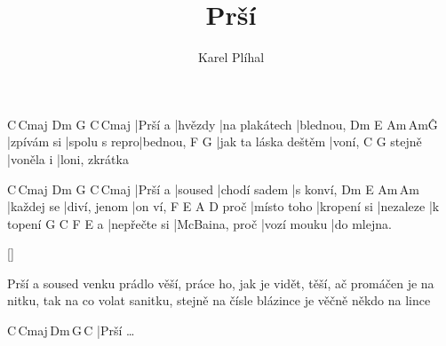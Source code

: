 \documentclass{song}
\title{Prší}
\author{Karel Plíhal}
\begin{document}
C\,Cmaj\7 Dm      G             C\,Cmaj\7
|Prší a   |hvězdy |na plakátech |blednou,
Dm         E             Am\,Am\^G
|zpívám si |spolu s repro|bednou,
F                    G
|jak ta láska deštěm |voní,
       C         G
stejně |voněla i |loni, zkrátka
\endstrophe

\strophe
C\,Cmaj\7 Dm      G            C\,Cmaj\7
|Prší a   |soused |chodí sadem |s konví,
Dm         E            Am\,Am\7
|každej se |diví, jenom |on ví,
     F           E           A         D
proč |místo toho |kropení si |nezaleze |k topení
  G            C              F           E
a |nepřečte si |McBaina, proč |vozí mouku |do mlejna.
\endstrophe

\ref{}

\strophe*
Prší a soused venku prádlo věší,
práce ho, jak je vidět, těší,
ač promáčen je na nitku, tak na co volat sanitku,
stejně na čísle blázince je věčně někdo na lince
\endstrophe

\strophe
C\,Cmaj\7\,Dm\,G\,C
|Prší \ldots
\endstrophe
\end{document}
